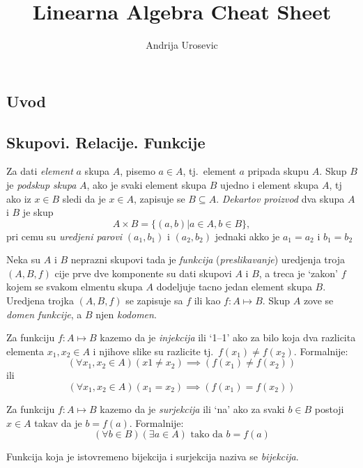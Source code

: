 \documentclass[12p,a4paper]{article}
\title{Linearna Algebra Cheat Sheet}
\author{Andrija Urosevic}
\begin{document}
\maketitle

\begin{multicols}{2}

\section{Uvod}

\subsection{Skupovi. Relacije. Funkcije}

    Za dati \textit{element} $a$ skupa $A$, pisemo $a \in A$, tj.\ element 
    $a$ pripada skupu $A$.
    Skup $B$ je \textit{podskup skupa} $A$, ako je svaki element skupa $B$ 
    ujedno i element skupa $A$, tj ako iz $x \in B$ sledi da je $x \in A$, 
    zapisuje se $B \subseteq A$.
    \textit{Dekartov proizvod} dva skupa $A$ i $B$ je skup
    \[A \times B = \{(a, b) | a \in A, b \in B\},\]
    pri cemu su \textit{uredjeni parovi} $(a_1, b_1)$ i $(a_2, b_2)$ jednaki 
    akko je $a_1 = a_2$ i $b_1 = b_2$

    Neka su $A$ i $B$ neprazni skupovi tada je \textit{funkcija} 
    (\textit{preslikavanje}) uredjenja troja $(A, B, f)$ cije prve dve 
    komponente su dati skupovi $A$ i $B$, a treca je `zakon' $f$ kojem se 
    svakom elmentu skupa $A$ dodeljuje tacno jedan element skupa $B$. Uredjena 
    trojka $(A, B, f)$ se zapisuje sa $f$ ili kao $f:A \mapsto B$.
    Skup $A$ zove se \textit{domen funkcije}, a $B$ njen \textit{kodomen}.

    Za funkciju $f : A \mapsto B$ kazemo da je \textit{injekcija} ili `1--1' 
    ako za bilo koja dva razlicita elementa $x_1, x_2 \in A$ i njihove slike 
    su razlicite tj.\ $f(x_1) \neq f(x_2)$. Formalnije:
    \[(\forall x_1, x_2 \in A) (x1 \neq x_2) \implies (f(x_1) \neq f(x_2))\]
    ili
    \[(\forall x_1, x_2 \in A) (x_1 = x_2) \implies (f(x_1) = f(x_2))\]

    Za funkciju $f : A \mapsto B$ kazemo da je \textit{surjekcija} ili `na' 
    ako za svaki $b \in B$ postoji $x \in A$ takav da je $b = f(a)$. 
    Formalnije:
    \[(\forall b \in B) (\exists a \in A)\text{ tako da } b = f(a)\]

    Funkcija koja je istovremeno bijekcija i surjekcija naziva se 
    \textit{bijekcija}.


\end{multicols}
\end{document}
